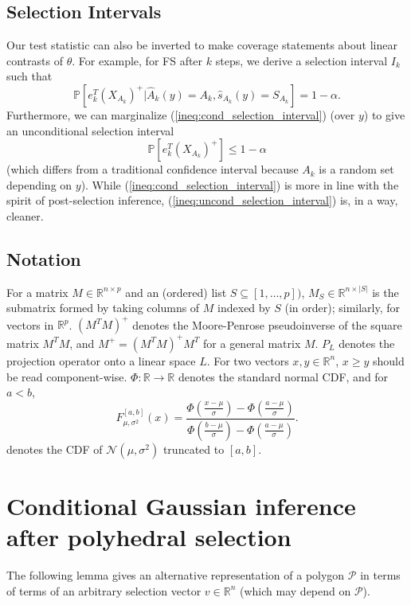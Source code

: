 \documentclass{article}
\newcommand{\R}{\mathbb{R}}                         %
\newcommand{\pr}{\mathbb{P}}                        %
\renewcommand{\hat}{\widehat}
\newcommand{\poly}{\mathcal{P}}
\begin{document}
\subsection{Selection Intervals}
Our test statistic can also be inverted to make coverage statements about
linear contrasts of $\theta$. For example, for FS after $k$ steps, we derive a
selection interval $I_k$ such that
\begin{equation}
\pr\left[ e_k^T (X_{A_k})^+ | \hat A_k(y) = A_k,
                                            \hat s_{A_k}(y) = S_{A_k} \right]
    = 1 - \alpha.
\label{ineq:cond_selection_interval}
\end{equation}
Furthermore, we can marginalize (\ref{ineq:cond_selection_interval}) (over $y$)
to give an unconditional selection interval
\begin{equation}
\pr\left[ e_k^T (X_{A_k})^+ \right] \leq 1 - \alpha
\label{ineq:uncond_selection_interval}
\end{equation}
(which differs from a traditional confidence interval because $A_k$ is a random
set depending on $y$). While (\ref{ineq:cond_selection_interval}) is more in
line with the spirit of post-selection inference,
(\ref{ineq:uncond_selection_interval}) is, in a way, cleaner.

\subsection{Notation}
For a matrix $M \in \R^{n \times p}$ and an (ordered) list
$S \subseteq [1,\dots,p])$, $M_S \in \R^{n \times |S|}$ is the submatrix formed
by taking columns of $M$ indexed by $S$ (in order); similarly, for vectors in
$\R^p$. $(M^TM)^+$ denotes the Moore-Penrose pseudoinverse of the square matrix
$M^TM$, and $M^+ = (M^TM)^+M^T$ for a general matrix $M$. $P_L$ denotes the
projection operator onto a linear space $L$. For two vectors $x, y \in \R^n$,
$x \geq y$ should be read component-wise. $\Phi : \R \to \R$ denotes the
standard normal CDF, and for $a < b$,
\[F^{[a,b]}_{\mu,\sigma^2}(x)
    = \frac{\Phi\left( \frac{x - \mu}{\sigma} \right)
                                - \Phi\left( \frac{a - \mu}{\sigma} \right)}
        {\Phi\left( \frac{b - \mu}{\sigma} \right)
                                - \Phi\left( \frac{a - \mu}{\sigma} \right)}.
\]
denotes the CDF of $\mathcal{N}(\mu, \sigma^2)$ truncated to $[a,b]$.


\section{Conditional Gaussian inference after polyhedral selection}
The following lemma gives an alternative representation of a polygon $\poly$ in
terms of terms of an arbitrary selection vector $v \in \R^n$ (which may depend
on $\poly$). \\
\end{document}
